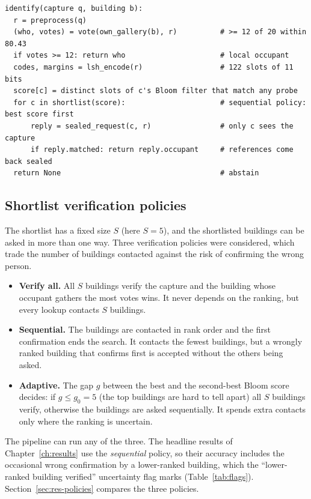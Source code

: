 \documentclass[12pt,a4paper,oneside]{report}
\begin{document}
{\small
\begin{verbatim}
identify(capture q, building b):
  r = preprocess(q)
  (who, votes) = vote(own_gallery(b), r)          # >= 12 of 20 within 80.43
  if votes >= 12: return who                      # local occupant
  codes, margins = lsh_encode(r)                  # 122 slots of 11 bits
  score[c] = distinct slots of c's Bloom filter that match any probe
  for c in shortlist(score):                      # sequential policy: best score first
      reply = sealed_request(c, r)                # only c sees the capture
      if reply.matched: return reply.occupant     # references come back sealed
  return None                                     # abstain
\end{verbatim}}

\subsection{Shortlist verification policies}\label{sec:policies}
The shortlist has a fixed size $S$ (here $S=5$), and the shortlisted buildings can be asked in more than one way. Three verification policies were considered, which trade the number of buildings contacted against the risk of confirming the wrong person.
\begin{itemize}
\item \textbf{Verify all.} All $S$ buildings verify the capture and the building whose occupant gathers the most votes wins. It never depends on the ranking, but every lookup contacts $S$ buildings.
\item \textbf{Sequential.} The buildings are contacted in rank order and the first confirmation ends the search. It contacts the fewest buildings, but a wrongly ranked building that confirms first is accepted without the others being asked.
\item \textbf{Adaptive.} The gap $g$ between the best and the second-best Bloom score decides: if $g\le g_0=5$ (the top buildings are hard to tell apart) all $S$ buildings verify, otherwise the buildings are asked sequentially. It spends extra contacts only where the ranking is uncertain.
\end{itemize}
The pipeline can run any of the three. The headline results of Chapter~\ref{ch:results} use the \emph{sequential} policy, so their accuracy includes the occasional wrong confirmation by a lower-ranked building, which the ``lower-ranked building verified'' uncertainty flag marks (Table~\ref{tab:flags}). Section~\ref{sec:res-policies} compares the three policies.
\end{document}
